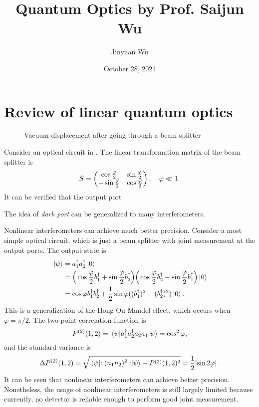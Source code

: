 \documentclass[hyperref, a4paper]{article}
\title{Quantum Optics by Prof. Saijun Wu}
\author{Jinyuan Wu}
\date{October 28, 2021}
\begin{document}
\maketitle

\section{Review of linear quantum optics}

\begin{figure}
    \centering
    
    \caption{Vacuum displacement after going through a beam splitter}
    \label{fig:vacuum-displacement}
\end{figure}

Consider an optical circuit in . The linear transformation matrix of the beam splitter is 
\begin{equation}
    S = \pmqty{ \cos \frac{\varphi}{2} & \sin \frac{\varphi}{2} \\ - \sin \frac{\varphi}{2} & \cos \frac{\varphi}{2} }, \quad \varphi \ll 1.
\end{equation}
It can be verified that the output port 

The idea of \emph{dark port} can be generalized to many interferometers.

Nonlinear interferometers can achieve much better precision. Consider a most simple optical circuit, which is just a beam splitter with joint measurement at the output ports. 
The output state is 
\begin{equation}
    \begin{aligned}
        \ket*{\psi} &= a^\dagger_1 a^\dagger_2 \ket*{0} \\
        &= \Big( \cos\frac{\varphi}{2} b_1^\dagger + \sin\frac{\varphi}{2} b_2^\dagger \Big) \Big( \cos\frac{\varphi}{2} b_2^\dagger - \sin\frac{\varphi}{2} b_1^\dagger \Big) \ket*{0} \\
        &= \cos \varphi b_1^\dagger b_2^\dagger + \frac{1}{2} \sin \varphi ((b_1^\dagger)^2 - (b_2^\dagger)^2) \ket*{0}. 
    \end{aligned}
\end{equation}
This is a generalization of the Hong-Ou-Mandel effect, which occurs when $\varphi = \pi / 2$.
The two-point correlation function is 
\begin{equation}
    P^{(2)}(1, 2) = \expval*{a_1^\dagger a_2^\dagger a_2 a_1}{\psi} = \cos^2 \varphi,    
\end{equation}
and the standard variance is 
\begin{equation}
    \Delta P^{(2)}(1, 2) = \sqrt{ \expval*{:(n_1 n_2)^2:}{\psi}  - P^{(2)}(1, 2)^2} = \frac{1}{2} \abs*{\sin 2 \varphi}.
\end{equation}
It can be seen that nonlinear interferometers can achieve better precision.
Nonetheless, the usage of nonlinear interferometers is still largely limited because currently, 
no detector is reliable enough to perform good joint measurement.
\end{document}
